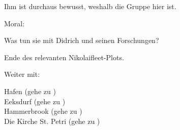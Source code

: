 Ihm ist durchaus bewusst, weshalb die Gruppe hier ist.


Moral:

Was tun sie mit Didrich und seinen Forschungen?

Ende des relevanten Nikolaifleet-Plots.

Weiter mit:

Hafen (gehe zu \blue{\ref{Hafen}}) \\
Eeksdurf (gehe zu \blue{\ref{xd}}) \\
Hammerbrook (gehe zu \blue{\ref{arm}}) \\
Die Kirche St. Petri (gehe zu \blue{\ref{Petri}}) \\
